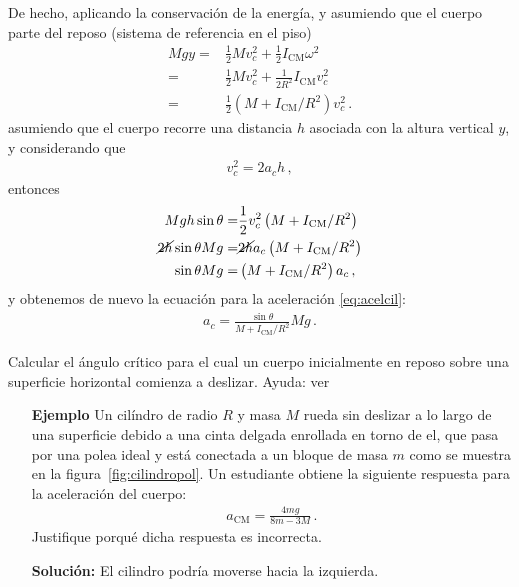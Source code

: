 De hecho, aplicando la conservación de la energía, y asumiendo que el cuerpo parte del reposo (sistema de referencia en el piso)
\begin{align*}
  Mgy=&\frac{1}{2}Mv_c^2+\frac{1}{2}I_{\text{CM}}\omega^2\nonumber\\
  =&\frac{1}{2}Mv_c^2+\frac{1}{2R^2}I_{\text{CM}}v_c^2\nonumber\\
  =&\frac{1}{2}\left(M+I_{\text{CM}}/R^2\right)v_c^2\,.
\end{align*}
asumiendo que el cuerpo recorre una distancia $h$ asociada con la altura vertical $y$, y considerando que
\begin{align*}
  v_c^2=2a_c h\,,
\end{align*}
entonces
\begin{align*}
  Mgh\sin\theta=&\frac{1}{2}v_c^2\left(M+I_{\text{CM}}/R^2\right)\nonumber\\
  \cancel{2h}\sin\theta Mg=&\cancel{2h}a_c\left(M+I_{\text{CM}}/R^2\right)\nonumber\\
  \sin\theta Mg=&\left(M+I_{\text{CM}}/R^2\right)a_c\,,
\end{align*}
y obtenemos de nuevo la ecuación para la aceleración \eqref{eq:acelcil}:
\begin{align*}
  a_c=\frac{\sin\theta}{M+I_{\text{CM}}/R^2}Mg\,.
\end{align*}

\ejercicio{}
Calcular el ángulo crítico para el cual un cuerpo inicialmente en reposo sobre una superficie horizontal comienza a deslizar. Ayuda: ver 




\begin{itemize}
\item[\textbf{Ejemplo}]     Un cilíndro de radio $R$ y masa $M$ rueda sin deslizar a lo largo
    de una superficie debido a una cinta delgada enrollada en torno de
    el, que pasa por una polea ideal y está conectada a un bloque de
    masa $m$ como se muestra en la figura~\ref{fig:cilindropol}. Un estudiante obtiene la siguiente respuesta para la aceleración del cuerpo:
    \begin{align*}
      a_{\text{CM}}=\frac{4mg}{8m-3M}\,.
    \end{align*}
Justifique porqué dicha respuesta es incorrecta. 



\item[\textbf{Solución:}] El cilindro podría moverse hacia la izquierda.


\end{itemize}

